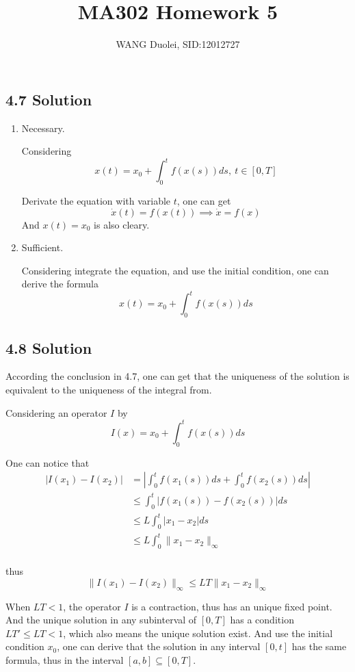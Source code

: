 \documentclass{article}
\title{MA302 Homework 5}
\author{WANG Duolei, SID:12012727}
\affil{wangdl2020@mail.sustech.edu.cn}
\date{}
\begin{document}
\maketitle


\subsection*{4.7 Solution}
\begin{enumerate}
    \item Necessary.
    
    Considering
    \[x(t) = x_0 + \int_0^t f(x(s)) ds,\ t \in [0, T]\]

    Derivate the equation with variable \(t\), one can get 
    \[\dot x(t) = f(x(t)) \implies \dot x = f(x)\]
    And \(x(t) = x_0\) is also cleary.

    \item Sufficient.
    
    Considering integrate the equation, and use the initial condition, one can derive the formula
    \[x(t) = x_0 + \int_{0}^t f(x(s)) ds\]
\end{enumerate}


\subsection*{4.8 Solution}
According the conclusion in 4.7, one can get that the uniqueness of the solution is equivalent to the uniqueness of the integral from.

Considering an operator \(I\) by 
\[I(x) = x_0 + \int_0^t f(x(s)) ds \]

One can notice that 
\begin{align*}
    |I(x_1) - I(x_2)| &= |\int_{0}^t f(x_1(s)) ds + \int_{0}^t f(x_2(s)) ds |\\
    &\le \int_{0}^t |f(x_1(s)) - f(x_2(s))| ds\\
    &\le L \int_{0}^t |x_1 - x_2| ds \\
    &\le L \int_{0}^t \|x_1 - x_2\|_{\infty} \\
\end{align*}

thus
\[\|I(x_1) - I(x_2)\|_{\infty} \le LT\|x_1 - x_2\|_{\infty}\]

When \(LT < 1\), the operator \(I\) is a contraction, thus has an unique fixed point. And the unique solution in any subinterval of \([0, T]\) has a condition \(LT' \le LT < 1\), which also means the unique solution exist. And use the initial condition \(x_0\), one can derive that the solution in any interval \([0, t]\) has the same formula, thus in the interval \([a, b] \subseteq [0, T]\).
\end{document}
